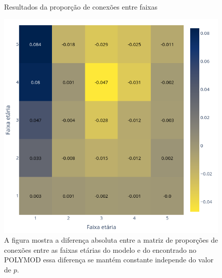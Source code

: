 \begin{figure}[H]
    \centering
    
    \captionsetup{font=normalsize,skip=0.8pt,singlelinecheck=on,labelsep=endash}
    \caption{Resultados da proporção de conexões entre faixas}
    \includegraphics[scale= 0.4]{figuras/modelo.png}
    \captionsetup{font=small,justification=justified}
    \caption*{ A figura mostra a diferença absoluta entre a matriz de proporções de conexões entre as faixas etárias do modelo e do encontrado no POLYMOD essa diferença se mantém constante independe do valor de $p$.}
    \label{fig:modelo}
\end{figure}

